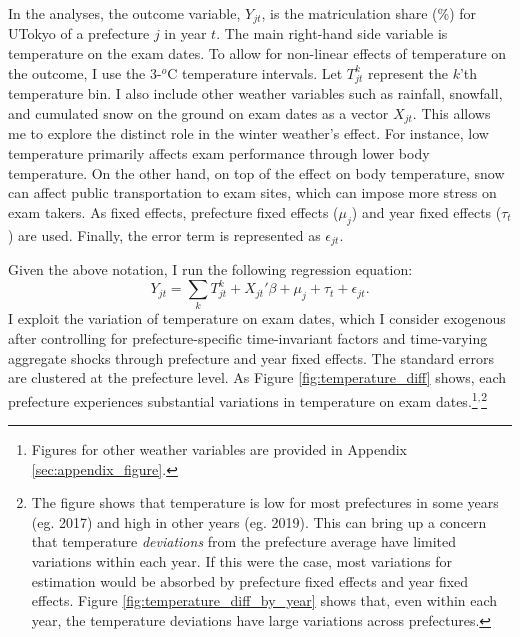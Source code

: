\documentclass[12pt,letterpaper]{article}
\begin{document}
In the analyses, the outcome variable, $Y_{jt}$, is the matriculation share (\%) for UTokyo of a prefecture $j$ in year $t$.
The main right-hand side variable is temperature on the exam dates.
To allow for non-linear effects of temperature on the outcome, I use the 3-$^o$C temperature intervals.
Let $T_{jt}^k$ represent the $k$'th temperature bin.
I also include other weather variables such as rainfall, snowfall, and cumulated snow on the ground on exam dates as a vector $X_{jt}$.
This allows me to explore the distinct role in the winter weather's effect.
For instance, low temperature primarily affects exam performance through lower body temperature.
On the other hand, on top of the effect on body temperature, snow can affect public transportation to exam sites, which can impose more stress on exam takers.
As fixed effects, prefecture fixed effects ($\mu_j$) and year fixed effects ($\tau_t$) are used.
Finally, the error term is represented as $\epsilon_{jt}$.

Given the above notation, I run the following regression equation:
\begin{equation*}
  Y_{jt} = \sum_k T_{jt}^k + X_{jt}' \beta + \mu_j + \tau_t + \epsilon_{jt}.
\end{equation*}
I exploit the variation of temperature on exam dates, which I consider exogenous after controlling for prefecture-specific time-invariant factors and time-varying aggregate shocks through prefecture and year fixed effects.
The standard errors are clustered at the prefecture level.
As Figure \ref{fig:temperature_diff} shows, each prefecture experiences substantial variations in temperature on exam dates.\footnote{
  Figures for other weather variables are provided in Appendix \ref{sec:appendix_figure}.
}$^,$\footnote{
  The figure shows that temperature is low for most prefectures in some years (eg. 2017) and high in other years (eg. 2019).
  This can bring up a concern that temperature \textit{deviations} from the prefecture average have limited variations within each year.
  If this were the case, most variations for estimation would be absorbed by prefecture fixed effects and year fixed effects.
  Figure \ref{fig:temperature_diff_by_year} shows that, even within each year, the temperature deviations have large variations across prefectures.
}
\end{document}
